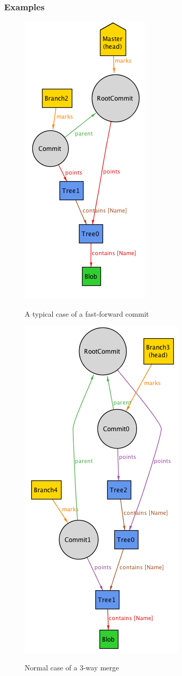 \subsubsection{Examples}
\begin{figure} 
	\caption{A typical case of a fast-forward commit}
	\centering
	\includegraphics[scale=0.65]{images/fastforward.png}
	\label{fig:fastforward}
\end{figure}
\begin{figure} 
	\caption{Normal case of a 3-way merge}
	\centering
	\includegraphics[scale=0.65]{images/normalmerge.png}
	\label{fig:merge}
\end{figure}

